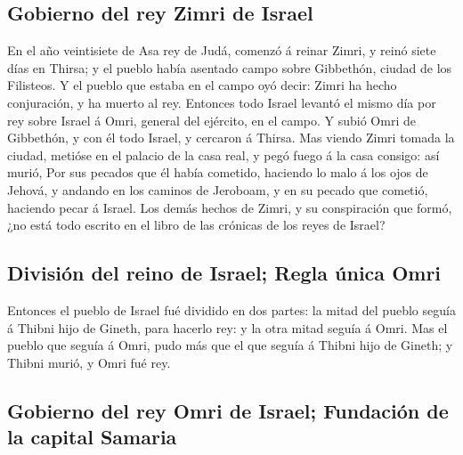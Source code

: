 \hypertarget{gobierno-del-rey-zimri-de-israel}{%
\subsection{Gobierno del rey Zimri de
Israel}\label{gobierno-del-rey-zimri-de-israel}}

 En el año veintisiete de Asa rey de Judá, comenzó á
reinar Zimri, y reinó siete días en Thirsa; y el pueblo había asentado
campo sobre Gibbethón, ciudad de los Filisteos.  Y el
pueblo que estaba en el campo oyó decir: Zimri ha hecho conjuración, y
ha muerto al rey. Entonces todo Israel levantó el mismo día por rey
sobre Israel á Omri, general del ejército, en el campo. 
Y subió Omri de Gibbethón, y con él todo Israel, y cercaron á Thirsa.
 Mas viendo Zimri tomada la ciudad, metióse en el palacio
de la casa real, y pegó fuego á la casa consigo: así murió,
 Por sus pecados que él había cometido, haciendo lo malo
á los ojos de Jehová, y andando en los caminos de Jeroboam, y en su
pecado que cometió, haciendo pecar á Israel.  Los demás
hechos de Zimri, y su conspiración que formó, ¿no está todo escrito en
el libro de las crónicas de los reyes de Israel?

\hypertarget{divisiuxf3n-del-reino-de-israel-regla-uxfanica-omri}{%
\subsection{División del reino de Israel; Regla única
Omri}\label{divisiuxf3n-del-reino-de-israel-regla-uxfanica-omri}}

 Entonces el pueblo de Israel fué dividido en dos partes:
la mitad del pueblo seguía á Thibni hijo de Gineth, para hacerlo rey: y
la otra mitad seguía á Omri.  Mas el pueblo que seguía á
Omri, pudo más que el que seguía á Thibni hijo de Gineth; y Thibni
murió, y Omri fué rey.

\hypertarget{gobierno-del-rey-omri-de-israel-fundaciuxf3n-de-la-capital-samaria}{%
\subsection{Gobierno del rey Omri de Israel; Fundación de la capital
Samaria}\label{gobierno-del-rey-omri-de-israel-fundaciuxf3n-de-la-capital-samaria}}

